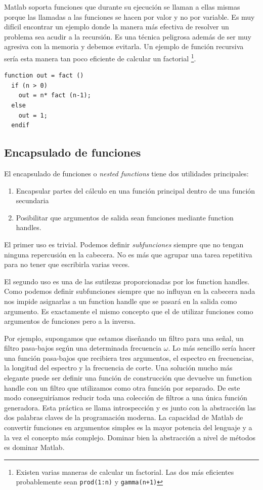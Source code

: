 Matlab soporta funciones que durante su ejecución se llaman a ellas
mismas porque las llamadas a las funciones se hacen por valor y no por
variable. Es muy difícil encontrar un ejemplo donde la manera más
efectiva de resolver un problema sea acudir a la recursión. Es una
técnica peligrosa además de ser muy agresiva con la memoria y debemos
evitarla. Un ejemplo de función recursiva sería esta manera tan poco
eficiente de calcular un factorial%
\footnote{Existen varias maneras de calcular un factorial. Las dos más
  eficientes probablemente sean \texttt{prod(1:n)} y
  \texttt{gamma(n+1)}%
}.

\begin{verbatim}
function out = fact ()
  if (n > 0)
    out = n* fact (n-1);
  else
    out = 1;
  endif
\end{verbatim}

\subsection{Encapsulado de funciones}

El encapsulado de funciones o \emph{nested functions} tiene dos
utilidades principales:

\begin{enumerate}
\item Encapsular partes del cálculo en una función principal dentro de
  una función secundaria
\item Posibilitar que argumentos de salida sean funciones mediante
  function handles.
\end{enumerate}
El primer uso es trivial. Podemos definir \emph{subfunciones} siempre
que no tengan ninguna repercusión en la cabecera. No es más que
agrupar una tarea repetitiva para no tener que escribirla varias
veces.

El segundo uso es una de las sutilezas proporcionadas por los function
handles. Como podemos definir subfunciones siempre que no influyan en
la cabecera nada nos impide asignarlas a un function handle que se
pasará en la salida como argumento. Es exactamente el mismo concepto
que el de utilizar funciones como argumentos de funciones pero a la
inversa.

Por ejemplo, supongamos que estamos diseñando un filtro para una
señal, un filtro pasa-bajos según una determinada frecuencia $\omega$.
Lo más sencillo sería hacer una función pasa-bajos que recibiera tres
argumentos, el espectro en frecuencias, la longitud del espectro y la
frecuencia de corte. Una solución mucho más elegante puede ser definir
una función de construcción que devuelve un function handle con un
filtro que utilizamos como otra función por separado. De este modo
conseguiríamos reducir toda una colección de filtros a una única
función generadora. Esta práctica se llama introspección y es junto
con la abstracción las dos palabras claves de la programación moderna.
La capacidad de Matlab de convertir funciones en argumentos simples es
la mayor potencia del lenguaje y a la vez el concepto más complejo.
Dominar bien la abstracción a nivel de métodos es dominar Matlab.


